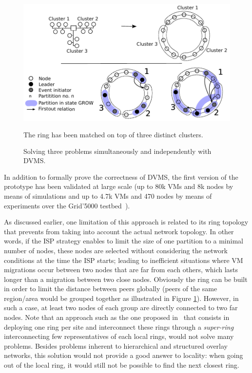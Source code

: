 \begin{figure}[h!]
  \centering
  \includegraphics[width=0.9\linewidth]{Figures/resourceAcquisition-standard.pdf}
  \caption{Solving three problems simultaneously and independently with DVMS.}%
\small{The ring has been matched on top of three distinct clusters.}
  \label{fig:isp}%
\end{figure}

In addition to formally prove the correctness of DVMS, the first version of the prototype
has been validated at large scale (up to 80k VMs and 8k nodes by means of simulations and
up to 4.7k VMs and 470 nodes by means of experiments over the Grid'5000
testbed~\cite{quesnel:ispa2013}).

As discussed earlier, one limitation of this approach is related to its ring topology that
prevents from taking into account the actual network topology.
%
%
%
In other words, if the ISP strategy enables to limit the size of one partition to a
minimal number of nodes, these nodes are selected without considering the network
conditions at the time the ISP starts; leading to inefficient situations where VM
migrations occur between two nodes that are far from each others, which lasts longer than a
migration between two close nodes. Obviously the ring can be built in order to limit the
distance between peers globally (\ie peers of the same region/area would be grouped
together as illustrated in Figure \ref{fig:isp}). However, in such a case, at least two
nodes of each group are directly connected to two far nodes.
%
Note that an approach such as the one proposed in~\cite{superchord} that consists in
deploying one ring per site and interconnect these rings through a \emph{super-ring}
interconnecting few representatives of each local rings, would not solve many
problems. Besides problems inherent to hierarchical and structured overlay networks, this
solution would not provide a good answer to locality: when going out of the local ring, it
would still not be possible to find the next closest ring.
%

